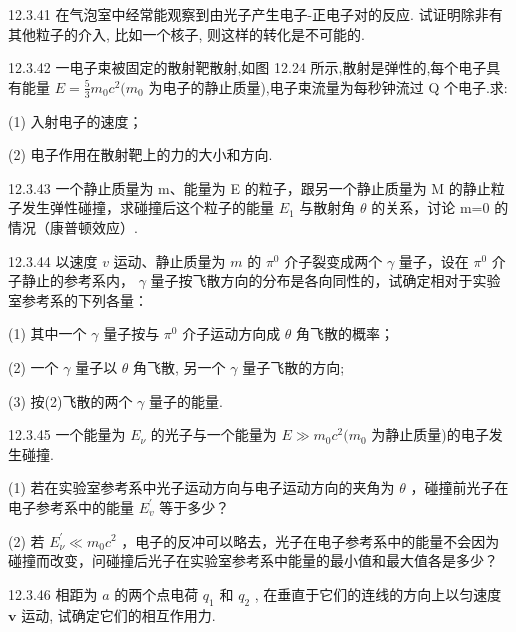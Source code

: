 \begin{problem}{12.3.41}
在气泡室中经常能观察到由光子产生电子-正电子对的反应. 试证明除非有其他粒子的介入, 比如一个核子, 则这样的转化是不可能的.
\end{problem}
\clearpage


\begin{problem}{12.3.42}
一电子束被固定的散射靶散射,如图 12.24 所示,散射是弹性的,每个电子具有能量 $E=\frac{5}{3}m_{0}c^{2}(m_{0}$ 为电子的静止质量),电子束流量为每秒钟流过 Q 个电子.求:

(1) 入射电子的速度；

(2) 电子作用在散射靶上的力的大小和方向.
\begin{center}

\end{center}
\end{problem}
\clearpage


\begin{problem}{12.3.43}
一个静止质量为 m、能量为 E 的粒子，跟另一个静止质量为 M 的静止粒子发生弹性碰撞，求碰撞后这个粒子的能量 $E_{1}$ 与散射角 $\theta$ 的关系，讨论 m=0 的情况（康普顿效应）.
\end{problem}
\clearpage


\begin{problem}{12.3.44}
以速度 $v$ 运动、静止质量为 $m$ 的 $\pi^0$ 介子裂变成两个 $\gamma$ 量子，设在 $\pi^0$ 介子静止的参考系内， $\gamma$ 量子按飞散方向的分布是各向同性的，试确定相对于实验室参考系的下列各量：

(1) 其中一个 $\gamma$ 量子按与 $\pi^{0}$ 介子运动方向成 $\theta$ 角飞散的概率；

(2) 一个 $\gamma$ 量子以 $\theta$ 角飞散, 另一个 $\gamma$ 量子飞散的方向;

(3) 按(2)飞散的两个 $\gamma$ 量子的能量.
\end{problem}
\clearpage


\begin{problem}{12.3.45}
一个能量为 $E_{\nu}$ 的光子与一个能量为 $E \gg m_0 c^2 (m_0$ 为静止质量)的电子发生碰撞.

(1) 若在实验室参考系中光子运动方向与电子运动方向的夹角为 $\theta$ ，碰撞前光子在电子参考系中的能量 $E_{v}^{\prime}$ 等于多少？

(2) 若 $E_{\nu}^{\prime} \ll m_{0}c^{2}$ ，电子的反冲可以略去，光子在电子参考系中的能量不会因为碰撞而改变，问碰撞后光子在实验室参考系中能量的最小值和最大值各是多少？
\end{problem}
\clearpage


\begin{problem}{12.3.46}
相距为 $a$ 的两个点电荷 $q_{1}$ 和 $q_{2}$ , 在垂直于它们的连线的方向上以匀速度 $\bm{v}$ 运动, 试确定它们的相互作用力.
\end{problem}
\clearpage


